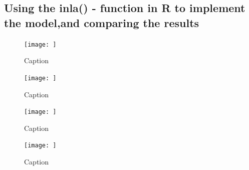 \subsection{Using the inla() - function in R to implement the model,and comparing the results}


\begin{figure}[h]
    \centering
    \texttt{[image: ]}
    \caption{Caption}
    \label{fig:my_label}
\end{figure}

\begin{figure}[h]
    \centering
    \texttt{[image: ]}
    \caption{Caption}
    \label{fig:my_label}
\end{figure}

\begin{figure}[h]
    \centering
    \texttt{[image: ]}
    \caption{Caption}
    \label{fig:my_label}
\end{figure}

\begin{figure}[h]
    \centering
    \texttt{[image: ]}
    \caption{Caption}
    \label{fig:my_label}
\end{figure}
